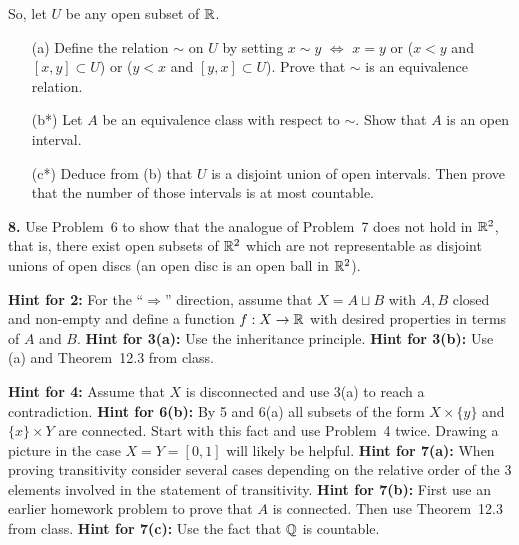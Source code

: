 \documentclass[11pt]{amsart}
\begin{document}
So, let $U$ be any open subset of ${\mathbb R}$.
\begin{itemize}
\item[(a)] Define the relation $\sim$ on $U$ by setting $x\sim y$ $\iff$ $x=y$ or 
($x<y$ and $[x,y]\subset U$) or ($y<x$ and $[y,x]\subset U$). Prove that $\sim$ is an equivalence
relation.
\item[(b*)] Let $A$ be an equivalence class with respect to $\sim$. Show that $A$ is an open interval.
\item[(c*)] Deduce from (b) that $U$ is a disjoint union of open intervals. Then prove that the number
of those intervals is at most countable. 
\end{itemize}
\skv
{\bf 8.}  Use Problem~6 to show that the analogue of Problem~7 does not hold in ${\mathbb R}^2$, that is,
there exist open subsets of ${\mathbb R}^2$ which are not representable as disjoint unions of open discs
(an open disc is an open ball in ${\mathbb R}^2$).
\skv

\newpage


{\bf Hint for 2:} For the ``$\Rightarrow$'' direction, assume that $X=A\sqcup B$
with $A, B$ closed and non-empty and define a function $f:X\to {\mathbb R}$ with desired properties
in terms of $A$ and $B$.
\newpage
{\bf Hint for 3(a):} Use the inheritance principle. 
\vskip 8cm
{\bf Hint for 3(b):} Use (a) and Theorem~12.3 from class. 

\newpage
{\bf Hint for 4:} Assume that $X$ is disconnected and use 3(a) to reach a contradiction.
\newpage
{\bf Hint for 6(b):} By 5 and 6(a) all subsets of the form $X\times\{y\}$ and $\{x\}\times Y$
are connected. Start with this fact and use Problem~4 twice. Drawing a picture in the case
$X=Y=[0,1]$ will likely be helpful.
\newpage
{\bf Hint for 7(a):} When proving transitivity consider several cases depending on the relative order of the 3 elements involved in the
statement of transitivity. 
\newpage
{\bf Hint for 7(b):} First use an earlier homework problem to prove that $A$ is connected. Then use Theorem~12.3 from class.
\newpage
{\bf Hint for 7(c):} Use the fact that ${\mathbb Q}$ is countable.
\end{document}
